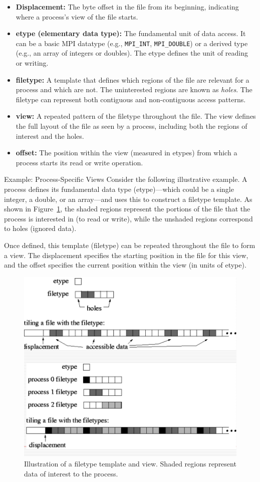 \documentclass[12pt]{book}
\begin{document}
\begin{itemize}
    \item \textbf{Displacement:} The byte offset in the file from its beginning, indicating where a process's view of the file starts.
    \item \textbf{etype (elementary data type):} The fundamental unit of data access. It can be a basic MPI datatype (e.g., \texttt{MPI\_INT}, \texttt{MPI\_DOUBLE}) or a derived type (e.g., an array of integers or doubles). The etype defines the unit of reading or writing.
    \item \textbf{filetype:} A template that defines which regions of the file are relevant for a process and which are not. The uninterested regions are known as \emph{holes}. The filetype can represent both contiguous and non-contiguous access patterns.
    \item \textbf{view:} A repeated pattern of the filetype throughout the file. The view defines the full layout of the file as seen by a process, including both the regions of interest and the holes.
    \item \textbf{offset:} The position within the view (measured in etypes) from which a process starts its read or write operation.
\end{itemize}

Example: Process-Specific Views
Consider the following illustrative example. A process defines its fundamental data type (etype)---which could be a single integer, a double, or an array---and uses this to construct a filetype template. As shown in Figure~\ref{fig:parallel_io_view}, the shaded regions represent the portions of the file that the process is interested in (to read or write), while the unshaded regions correspond to holes (ignored data).

Once defined, this template (filetype) can be repeated throughout the file to form a view. The displacement specifies the starting position in the file for this view, and the offset specifies the current position within the view (in units of etype).

\begin{figure}[h]
    \centering
    \includegraphics[width=0.5\linewidth]{images/parallel_io.png}
    \caption{Illustration of a filetype template and view. Shaded regions represent data of interest to the process.}
    \label{fig:parallel_io_view}
\end{figure}
\end{document}
